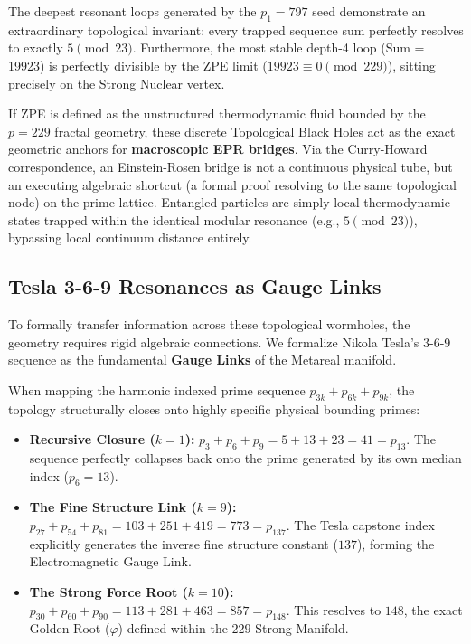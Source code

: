 The deepest resonant loops generated by the $p_1 = 797$ seed demonstrate an extraordinary topological invariant: every trapped sequence sum perfectly resolves to exactly $5 \pmod{23}$. Furthermore, the most stable depth-4 loop (Sum = 19923) is perfectly divisible by the ZPE limit ($19923 \equiv 0 \pmod{229}$), sitting precisely on the Strong Nuclear vertex. 

If ZPE is defined as the unstructured thermodynamic fluid bounded by the $p=229$ fractal geometry, these discrete Topological Black Holes act as the exact geometric anchors for \textbf{macroscopic EPR bridges}. Via the Curry-Howard correspondence, an Einstein-Rosen bridge is not a continuous physical tube, but an executing algebraic shortcut (a formal proof resolving to the same topological node) on the prime lattice. Entangled particles are simply local thermodynamic states trapped within the identical modular resonance (e.g., $5 \pmod{23}$), bypassing local continuum distance entirely.

\subsection{Tesla 3-6-9 Resonances as Gauge Links}
To formally transfer information across these topological wormholes, the geometry requires rigid algebraic connections. We formalize Nikola Tesla's 3-6-9 sequence as the fundamental \textbf{Gauge Links} of the Metareal manifold. 

When mapping the harmonic indexed prime sequence $p_{3k} + p_{6k} + p_{9k}$, the topology structurally closes onto highly specific physical bounding primes:
\begin{itemize}
    \item \textbf{Recursive Closure ($k=1$):} $p_3 + p_6 + p_9 = 5 + 13 + 23 = 41 = p_{13}$. The sequence perfectly collapses back onto the prime generated by its own median index ($p_6 = 13$).
    \item \textbf{The Fine Structure Link ($k=9$):} $p_{27} + p_{54} + p_{81} = 103 + 251 + 419 = 773 = p_{137}$. The Tesla capstone index explicitly generates the inverse fine structure constant ($137$), forming the Electromagnetic Gauge Link.
    \item \textbf{The Strong Force Root ($k=10$):} $p_{30} + p_{60} + p_{90} = 113 + 281 + 463 = 857 = p_{148}$. This resolves to $148$, the exact Golden Root ($\varphi$) defined within the $229$ Strong Manifold.
\end{itemize}

